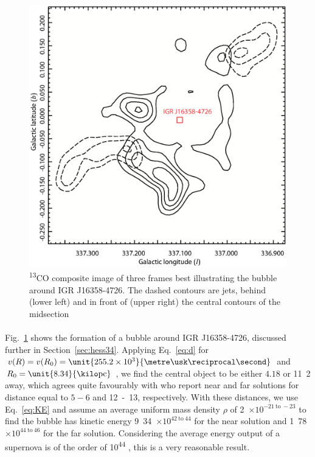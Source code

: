 \documentclass[a4paper, titlepage, oneside]{article}
\newcommand{\elem}[2]{\textsuperscript{#1}{#2}}
\newcommand{\e}[1]{\ensuremath{\times 10^{#1}}}
\newcommand{\parsec}{\mathrm{pc}}
\begin{document}
\begin{multicols}{2}
\begin{figure}[H]
  \centering
  \includegraphics[width = \columnwidth]{figures/bubble34}
  \caption{\elem{13}{C}O composite image of three frames best illustrating the bubble around IGR J16358-4726. The dashed contours are jets, behind (lower left) and in front of (upper right) the central contours of the midsection}
  \label{fig:bubble34}
\end{figure}

\paragraph{}
Fig.~\ref{fig:bubble34} shows the formation of a bubble around IGR J16358-4726, discussed further in Section~\ref{sec:hess34}. Applying Eq.~\ref{eq:d} for \(v(R) = v(R_0) = \unit{255.2\e{3}}{\metre\usk\reciprocal\second}\) and \(R_0 = \unit{8.34}{\kilo\parsec}\) \parencite{Reid:2014}, we find the central object to be either \(4.18\) or \unit{11.2}{\kilo\parsec} away, which agrees quite favourably with \textcite{Lutovinov:2005} who report near and far solutions for distance equal to \(5 - 6\) and \unit{12 - 13}{\kilo\parsec}, respectively. With these distances, we use Eq.~\ref{eq:KE} and assume an average uniform mass density \(\rho\) of \unit{2\e{-21 \mathrm{~to~} -23}}{\kilo\gram\usk\centi\metre\rpcubed} \parencite{Ferriere:2001} to find the bubble has kinetic energy \unit{9.34\e{42 \mathrm{~to~} 44}}{\joule} for the near solution and \unit{1.78\e{44 \mathrm{~to~} 46}}{\joule} for the far solution. Considering the average energy output of a supernova is of the order of \unit{10^{44}}{\joule} \parencite{Khokhlov:1993}, this is a very reasonable result.


\end{multicols}
\end{document}
